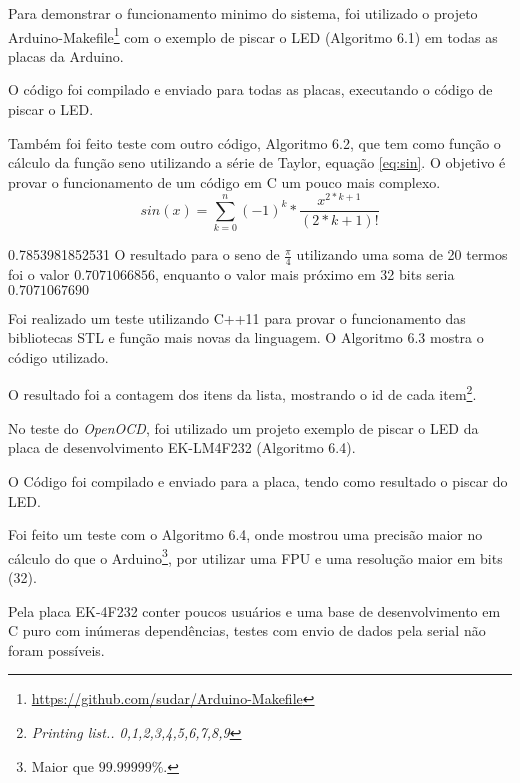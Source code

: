 Para demonstrar o funcionamento minimo do sistema, foi utilizado o projeto Arduino-Makefile\footnote{\url{https://github.com/sudar/Arduino-Makefile}} com o exemplo de piscar o LED (Algoritmo 6.1) em todas as placas da Arduino.



O código foi compilado e enviado para todas as placas, executando o código de piscar o LED.

Também foi feito teste com outro código, Algoritmo 6.2, que tem como função o cálculo da função seno utilizando a série de Taylor, equação \ref{eq:sin}. O objetivo é provar o funcionamento de um código em C um pouco mais complexo.
\begin{equation}
sin(x) = \sum_{k=0}^{n} (-1)^k * \frac{x^{2*k+1}}{(2*k+1)!}
\label{eq:sin} 
\end{equation}

0.7853981852531
O resultado para o seno de $\frac{\pi}{4}$ utilizando uma soma de 20 termos foi o valor $0.7071066856$, enquanto o valor mais próximo em 32 bits seria $0.7071067690$

Foi realizado um teste utilizando C++11 para provar o funcionamento das bibliotecas STL e função mais novas da linguagem. O Algoritmo 6.3 mostra o código utilizado.



O resultado foi a contagem dos itens da lista, mostrando o id de cada item\footnote{\textit{Printing list.. 0,1,2,3,4,5,6,7,8,9}}.

No teste do \textit{OpenOCD}, foi utilizado um projeto exemplo de piscar o LED da placa de desenvolvimento EK-LM4F232 (Algoritmo 6.4).



O Código foi compilado e enviado para a placa, tendo como resultado o piscar do LED.

Foi feito um teste com o Algoritmo 6.4, onde mostrou uma precisão maior no cálculo do que o Arduino\footnote{Maior que $99.99999\%$.}, por utilizar uma FPU e uma resolução maior em bits (32).



Pela placa EK-4F232 conter poucos usuários e uma base de desenvolvimento em C puro com inúmeras dependências, testes com envio de dados pela serial não foram possíveis.


